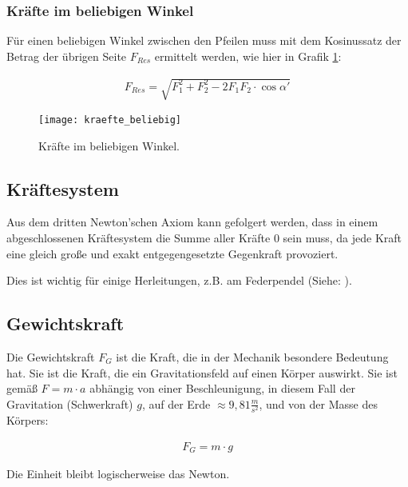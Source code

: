 \subsubsection{Kräfte im beliebigen Winkel}

\noindent Für einen beliebigen Winkel zwischen den Pfeilen muss mit dem Kosinussatz der Betrag der übrigen Seite $F_{Res}$ ermittelt werden, wie hier in Grafik \ref{fig:kraefte_beliebig}:

\begin{align}
	F_{Res} = \sqrt{F_1^2 + F_2^2 - 2F_1 F_2 \cdot \cos{\alpha '}}
\end{align}

\begin{figure}[h!]
	\centering
	\texttt{[image: kraefte\_beliebig]}
	\caption{Kräfte im beliebigen Winkel.}
	\label{fig:kraefte_beliebig}
\end{figure}




\subsection{Kräftesystem}

Aus dem dritten Newton'schen Axiom kann gefolgert werden, dass in einem abgeschlossenen Kräftesystem die Summe aller Kräfte $0$ sein muss, da jede Kraft eine gleich große und exakt entgegengesetzte Gegenkraft provoziert.

Dies ist wichtig für einige Herleitungen, z.B. am Federpendel (Siehe: ).


\subsection{Gewichtskraft} \label{subsec:Gewichtskraft}

Die Gewichtskraft $F_{G}$ ist die Kraft, die in der Mechanik besondere Bedeutung hat. Sie ist die Kraft, die ein Gravitationsfeld auf einen Körper auswirkt. Sie ist gemäß $F = m \cdot a$ abhängig von einer Beschleunigung, in diesem Fall der Gravitation (Schwerkraft) $g$, auf der Erde $\approx 9,81 \frac{m}{s^2}$, und von der Masse des Körpers:

\begin{align}
	F_{G} = m \cdot g
\end{align}

\noindent Die Einheit bleibt logischerweise das Newton.